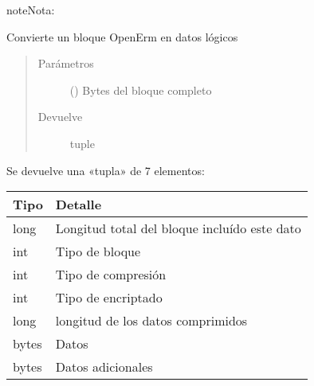 \documentclass[a4paper,12pt,spanish]{sphinxmanual}
\begin{document}
\begin{fulllineitems}
\begin{fulllineitems}
\begin{sphinxadmonition}{note}{Nota:}
\begin{sphinxVerbatim}[commandchars=\\\{\}]
                  
                       
\end{sphinxVerbatim}
\end{sphinxadmonition}

\end{fulllineitems}


\begin{fulllineitems}
\label{\detokenize{openerm.Block:openerm.Block.Block.load}}
Convierte un bloque OpenErm en datos lógicos
\begin{quote}\begin{description}
\item[{Parámetros}] \leavevmode
{} () \textendash{} Bytes del bloque completo

\item[{Devuelve}] \leavevmode
tuple

\end{description}\end{quote}

Se devuelve una «tupla» de 7 elementos:


\begin{savenotes}\sphinxattablestart
\centering
\begin{tabulary}{\linewidth}[t]{|T|T|}
\hline
\sphinxstyletheadfamily 
Tipo
&\sphinxstyletheadfamily 
Detalle
\\
\hline
long
&
Longitud total del bloque incluído este dato
\\
\hline
int
&
Tipo de bloque
\\
\hline
int
&
Tipo de compresión
\\
\hline
int
&
Tipo de encriptado
\\
\hline
long
&
longitud de los datos comprimidos
\\
\hline
bytes
&
Datos
\\
\hline
bytes
&
Datos adicionales
\\
\hline
\end{tabulary}
\par
\sphinxattableend\end{savenotes}

\end{fulllineitems}
\end{fulllineitems}
\end{document}
